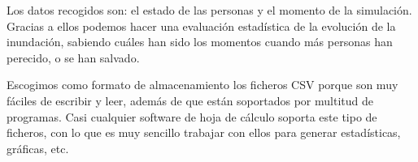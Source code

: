 Los datos recogidos son: el estado de las personas y el momento de la
simulación. Gracias a ellos podemos hacer una evaluación estadística de la
evolución de la inundación, sabiendo cuáles han sido los momentos cuando más
personas han perecido, o se han salvado.



Escogimos como formato de almacenamiento los ficheros CSV porque son muy fáciles
de escribir y leer, además de que están soportados por multitud de programas.
Casi cualquier software de hoja de cálculo soporta este tipo de ficheros, con
lo que es muy sencillo trabajar con ellos para generar estadísticas, gráficas,
etc.

